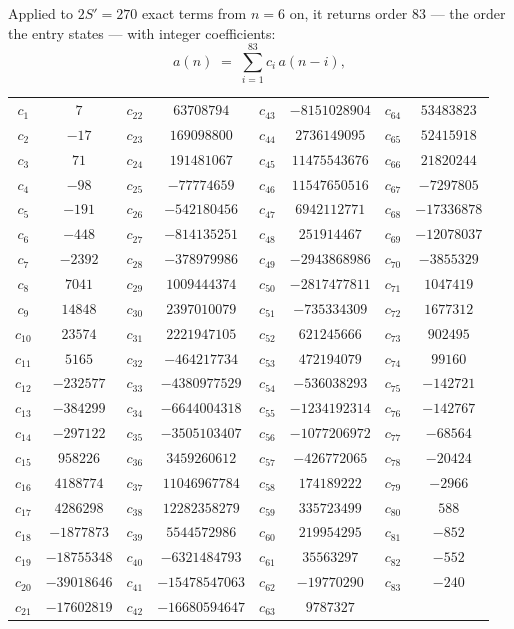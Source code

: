 \documentclass[11pt,a4paper]{article}
\theoremstyle{plain}
\theoremstyle{definition}
\begin{document}
Applied to $2S'=270$ exact terms from $n=6$ on, it returns order $83$ --- the
order the entry states --- with integer coefficients:
\[
a(n)\;=\;\sum_{i=1}^{83}c_i\,a(n-i),
\]
\begin{center}\small
\begin{tabular}{cccccccc}
$c_{1}$ & $7$ & $c_{22}$ & $63708794$ & $c_{43}$ & $-8151028904$ & $c_{64}$ & $53483823$ \\
$c_{2}$ & $-17$ & $c_{23}$ & $169098800$ & $c_{44}$ & $2736149095$ & $c_{65}$ & $52415918$ \\
$c_{3}$ & $71$ & $c_{24}$ & $191481067$ & $c_{45}$ & $11475543676$ & $c_{66}$ & $21820244$ \\
$c_{4}$ & $-98$ & $c_{25}$ & $-77774659$ & $c_{46}$ & $11547650516$ & $c_{67}$ & $-7297805$ \\
$c_{5}$ & $-191$ & $c_{26}$ & $-542180456$ & $c_{47}$ & $6942112771$ & $c_{68}$ & $-17336878$ \\
$c_{6}$ & $-448$ & $c_{27}$ & $-814135251$ & $c_{48}$ & $251914467$ & $c_{69}$ & $-12078037$ \\
$c_{7}$ & $-2392$ & $c_{28}$ & $-378979986$ & $c_{49}$ & $-2943868986$ & $c_{70}$ & $-3855329$ \\
$c_{8}$ & $7041$ & $c_{29}$ & $1009444374$ & $c_{50}$ & $-2817477811$ & $c_{71}$ & $1047419$ \\
$c_{9}$ & $14848$ & $c_{30}$ & $2397010079$ & $c_{51}$ & $-735334309$ & $c_{72}$ & $1677312$ \\
$c_{10}$ & $23574$ & $c_{31}$ & $2221947105$ & $c_{52}$ & $621245666$ & $c_{73}$ & $902495$ \\
$c_{11}$ & $5165$ & $c_{32}$ & $-464217734$ & $c_{53}$ & $472194079$ & $c_{74}$ & $99160$ \\
$c_{12}$ & $-232577$ & $c_{33}$ & $-4380977529$ & $c_{54}$ & $-536038293$ & $c_{75}$ & $-142721$ \\
$c_{13}$ & $-384299$ & $c_{34}$ & $-6644004318$ & $c_{55}$ & $-1234192314$ & $c_{76}$ & $-142767$ \\
$c_{14}$ & $-297122$ & $c_{35}$ & $-3505103407$ & $c_{56}$ & $-1077206972$ & $c_{77}$ & $-68564$ \\
$c_{15}$ & $958226$ & $c_{36}$ & $3459260612$ & $c_{57}$ & $-426772065$ & $c_{78}$ & $-20424$ \\
$c_{16}$ & $4188774$ & $c_{37}$ & $11046967784$ & $c_{58}$ & $174189222$ & $c_{79}$ & $-2966$ \\
$c_{17}$ & $4286298$ & $c_{38}$ & $12282358279$ & $c_{59}$ & $335723499$ & $c_{80}$ & $588$ \\
$c_{18}$ & $-1877873$ & $c_{39}$ & $5544572986$ & $c_{60}$ & $219954295$ & $c_{81}$ & $-852$ \\
$c_{19}$ & $-18755348$ & $c_{40}$ & $-6321484793$ & $c_{61}$ & $35563297$ & $c_{82}$ & $-552$ \\
$c_{20}$ & $-39018646$ & $c_{41}$ & $-15478547063$ & $c_{62}$ & $-19770290$ & $c_{83}$ & $-240$ \\
$c_{21}$ & $-17602819$ & $c_{42}$ & $-16680594647$ & $c_{63}$ & $9787327$ &  &  \\
\end{tabular}
\end{center}
\end{document}
